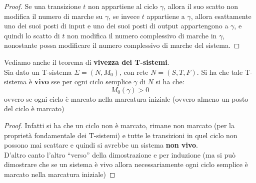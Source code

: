 \documentclass[a4paper,12pt, oneside]{book}
\begin{document}
\begin{proof}
  Se una transizione $t$ non appartiene al ciclo $\gamma$, allora il suo scatto
  non modifica il numero di marche su $\gamma$, se invece $t$ appartiene a
  $\gamma$, allora esattamente uno dei suoi posti di input e uno dei suoi posti
  di output appartengono a $\gamma$, e quindi lo scatto di $t$ non modifica il
  numero complessivo di marche in $\gamma$, nonostante possa modificare il
  numero complessivo di marche del sistema. 
\end{proof}
\newpage
\begin{teorema}
  Vediamo anche il teorema di \textbf{vivezza dei T-sistemi}.\\
  Sia dato un T-sistema $\Sigma = (N,M_0)$, con rete $N=(S,T,F)$. Si ha che
  tale T-sistema è \textbf{vivo} sse per ogni ciclo semplice $\gamma$ di $N$ si
  ha che:
  \[M_0(\gamma)>0\]
  ovvero se ogni ciclo è marcato nella marcatura iniziale (ovvero almeno un
  posto del ciclo è marcato)
\end{teorema}
\begin{proof}
  Infatti si ha che un ciclo non è marcato, rimane non marcato (per la
  proprietà fondamentale dei T-sistemi) e tutte le transizioni in quel ciclo non
  possono mai scattare e quindi si avrebbe un sistema \textbf{non vivo}. \\
  D'altro canto l'altro ``verso'' della dimostrazione e per induzione (ma si può
  dimostrare che se un sistema è vivo allora necessariamente ogni ciclo semplice
  è marcato nella marcatura iniziale) 
\end{proof}
\end{document}
